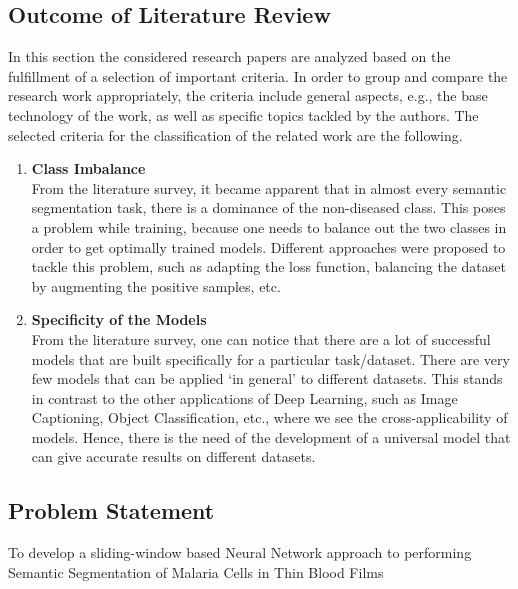 \documentclass{nitk}
\begin{document}
    \subsection{Outcome of Literature Review}
    {\hspace{20}In this section the considered research papers are analyzed based on the fulfillment of a selection of important criteria. In order to group and compare the research work appropriately, the criteria include general aspects, e.g., the base technology of the work, as well as specific topics tackled by the authors. The selected criteria for the classification of the related work are the following.
    
    \begin{enumerate}
    \item{\textbf{Class Imbalance}\\
    From the literature survey, it became apparent that in almost every semantic segmentation task, there is a dominance of the non-diseased class. This poses a problem while training, because one needs to balance out the two classes in order to get optimally trained models. Different approaches were proposed to tackle this problem, such as adapting the loss function, balancing the dataset by augmenting the positive samples, etc.}
    
    \item{\textbf{Specificity of the Models} \\
    From the literature survey, one can notice that there are a lot of successful models that are built specifically for a particular task/dataset. There are very few models that can be applied `in general' to different datasets. This stands in contrast to the other applications of Deep Learning, such as Image Captioning, Object Classification, etc., where we see the cross-applicability of models. Hence, there is the need of the development of a universal model that can give accurate results on different datasets. 
    }
    \end{enumerate}
    
    }
    
    \subsection{Problem Statement}
    {\hspace{20} To develop a sliding-window based Neural Network approach to performing Semantic Segmentation of Malaria Cells in Thin Blood Films}
    
\end{document}

